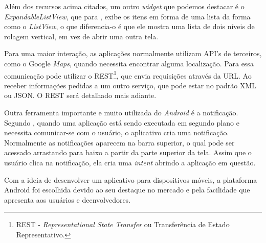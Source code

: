 	\par Além dos recursos acima citados, um outro \textit{widget} que podemos
destacar é o \textit{ExpandableListView}, que para , exibe os
itens em forma de uma lista da forma como o \textit{ListView}, o que
diferencia-o é que ele mostra uma lista de dois níveis de rolagem vertical, em
vez de abrir uma outra tela.
	
	\par Para uma maior interação, as aplicações normalmente utilizam API’s de
terceiros, como o Google \textit{Maps}, quando necessita encontrar alguma
localização. Para  essa comunicação pode utilizar o
REST\footnote{REST - \textit{Representational State Transfer} ou Transferência
de Estado Representativo.}, que envia requisições através da URL. Ao receber
informações pedidas a um outro serviço, que pode estar no padrão XML ou JSON. O
REST será detalhado mais adiante.

	\par Outra ferramenta importante e muito utilizada do \textit{Android} é a
notificação. Segundo , quando uma aplicação está
sendo executada em segundo plano e necessita comunicar-se com o usuário, o
aplicativo cria uma notificação. Normalmente as notificações aparecem na barra
superior, o qual pode ser acessado arrastando para baixo a partir da parte
superior da tela. Assim que o usuário clica na notificação, ela cria uma
\textit{intent} abrindo a aplicação em questão.

	\par Com a ideia de desenvolver um aplicativo para dispositivos móveis, a
plataforma Android foi escolhida devido ao seu destaque no mercado e pela
facilidade que apresenta aos usuários e deenvolvedores.